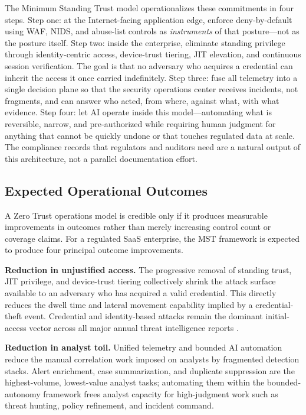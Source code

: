 \documentclass[acmlarge]{acmart}
\begin{document}
The Minimum Standing Trust model operationalizes these commitments in four steps.
Step one: at the Internet-facing application edge, enforce deny-by-default using WAF,
NIDS, and abuse-list controls as \textit{instruments} of that posture---not as the
posture itself. Step two: inside the enterprise, eliminate standing privilege through
identity-centric access, device-trust tiering, JIT elevation, and continuous session
verification. The goal is that no adversary who acquires a credential can inherit the
access it once carried indefinitely. Step three: fuse all telemetry into a single
decision plane so that the security operations center receives incidents, not
fragments, and can answer who acted, from where, against what, with what evidence.
Step four: let AI operate inside this model---automating what is reversible, narrow,
and pre-authorized while requiring human judgment for anything that cannot be quickly
undone or that touches regulated data at scale. The compliance records that regulators
and auditors need are a natural output of this architecture, not a parallel
documentation effort.

\subsection{Expected Operational Outcomes}

A Zero Trust operations model is credible only if it produces measurable improvements
in outcomes rather than merely increasing control count or coverage claims. For a regulated
SaaS enterprise, the MST framework is expected to produce four principal outcome improvements.

\textbf{Reduction in unjustified access.} The progressive removal of standing trust,
JIT privilege, and device-trust tiering collectively shrink the attack surface available
to an adversary who has acquired a valid credential. This directly reduces the dwell time
and lateral movement capability implied by a credential-theft event. Credential and
identity-based attacks remain the dominant initial-access vector across all major annual
threat intelligence reports \cite{verizon2025,crowdstrike2025,ciscotalos2025}.

\textbf{Reduction in analyst toil.} Unified telemetry and bounded AI automation reduce
the manual correlation work imposed on analysts by fragmented detection stacks. Alert
enrichment, case summarization, and duplicate suppression are the highest-volume, lowest-value
analyst tasks; automating them within the bounded-autonomy framework frees analyst capacity
for high-judgment work such as threat hunting, policy refinement, and incident command.
\end{document}
